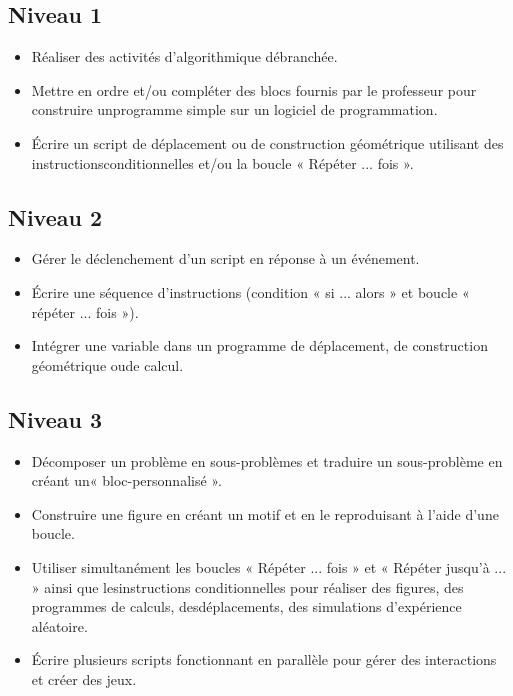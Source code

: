 \documentclass[a4paper,12pt,fleqn]{article}
\begin{document}
\renewcommand{\labelitemi}{}

\subsection*{Niveau 1}

\begin{itemize}
	\item {}Réaliser des activités d’algorithmique débranchée.
	\item {}Mettre en ordre et/ou compléter des blocs fournis par le professeur pour construire unprogramme simple sur un logiciel de programmation.
	\item {}Écrire un script de déplacement ou de construction géométrique utilisant des instructionsconditionnelles et/ou la boucle « Répéter ... fois ».
\end{itemize}
	
\subsection*{Niveau 2}

\begin{itemize}
	\item {}Gérer le déclenchement d'un script en réponse à un événement.
	\item {}Écrire une séquence d’instructions (condition « si ... alors » et boucle « répéter ... fois »).
	\item {}Intégrer une variable dans un programme de déplacement, de construction géométrique oude calcul.
\end{itemize}
	
\subsection*{Niveau 3}

\begin{itemize}
	\item {}Décomposer un problème en sous-problèmes et traduire un sous-problème en créant un« bloc-personnalisé ».
	\item {}Construire une figure en créant un motif et en le reproduisant à l’aide d’une boucle.
	\item {}Utiliser simultanément les boucles « Répéter ... fois » et « Répéter jusqu’à ... » ainsi que lesinstructions conditionnelles pour réaliser des figures, des programmes de calculs, desdéplacements, des simulations d’expérience aléatoire.
	\item {}Écrire plusieurs scripts fonctionnant en parallèle pour gérer des interactions et créer des jeux.
\end{itemize}
	
\end{document}
